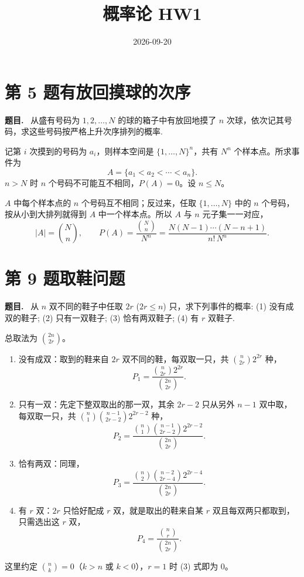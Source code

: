 \documentclass{article}
\title{概率论 HW1}
\author{\name \uid}
\date{2026-09-20}
\newenvironment{problem}{\par\medskip\noindent\textbf{题目.}\ }{\par\smallskip}
\begin{document}
\maketitle

\section*{第 5 题\quad 有放回摸球的次序}

\begin{problem}
  从盛有号码为 $1,2,\dots,N$ 的球的箱子中有放回地摸了 $n$ 次球，依次记其号码，求这些号码按严格上升次序排列的概率.
\end{problem}

\begin{solution}
  记第 $i$ 次摸到的号码为 $a_i$，则样本空间是 $\{1,\dots,N\}^n$，共有 $N^n$ 个样本点。所求事件为
  \[
    A=\{a_1<a_2<\cdots<a_n\}.
  \]
  $n>N$ 时 $n$ 个号码不可能互不相同，$P(A)=0$。设 $n\le N$。

  $A$ 中每个样本点的 $n$ 个号码互不相同；反过来，任取 $\{1,\dots,N\}$ 中的 $n$ 个号码，按从小到大排列就得到 $A$ 中一个样本点。所以 $A$ 与 $n$ 元子集一一对应，
  \[
    |A|=\binom Nn,
    \qquad
    P(A)=\frac{\binom Nn}{N^n}
    =\frac{N(N-1)\cdots(N-n+1)}{n!\,N^n}.
  \]

\end{solution}

\section*{第 9 题\quad 取鞋问题}

\begin{problem}
  从 $n$ 双不同的鞋子中任取 $2r$ ($2r\le n$) 只，求下列事件的概率:
  (1) 没有成双的鞋子; (2) 只有一双鞋子; (3) 恰有两双鞋子; (4) 有 $r$ 双鞋子.
\end{problem}

\begin{solution}
  总取法为 $\binom{2n}{2r}$。

  \begin{enumerate}[(1)]
    \item 没有成双：取到的鞋来自 $2r$ 双不同的鞋，每双取一只，共 $\binom{n}{2r}2^{2r}$ 种，
      \[
        P_1=\frac{\binom{n}{2r}2^{2r}}{\binom{2n}{2r}} .
      \]

    \item 只有一双：先定下整双取出的那一双，其余 $2r-2$ 只从另外 $n-1$ 双中取，每双取一只，共
      $\binom n1\binom{n-1}{2r-2}2^{2r-2}$ 种，
      \[
        P_2=\frac{\binom n1\binom{n-1}{2r-2}2^{2r-2}}{\binom{2n}{2r}} .
      \]

    \item 恰有两双：同理，
      \[
        P_3=\frac{\binom n2\binom{n-2}{2r-4}2^{2r-4}}{\binom{2n}{2r}} .
      \]

    \item 有 $r$ 双：$2r$ 只恰好配成 $r$ 双，就是取出的鞋来自某 $r$ 双且每双两只都取到，只需选出这 $r$ 双，
      \[
        P_4=\frac{\binom nr}{\binom{2n}{2r}} .
      \]
  \end{enumerate}

  这里约定 $\binom nk=0$（$k>n$ 或 $k<0$），$r=1$ 时 (3) 式即为 $0$。
\end{solution}
\end{document}
